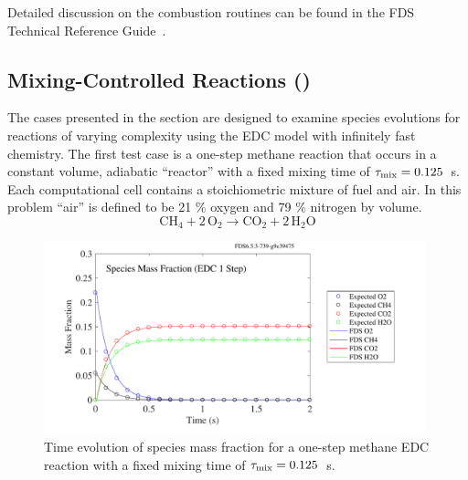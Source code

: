 \documentclass[11pt]{book}
\begin{document}
Detailed discussion on the combustion routines can be found in the FDS Technical Reference Guide~\cite{FDS_Tech_Guide}.

\subsection{Mixing-Controlled Reactions (\texorpdfstring{}{reactionrate\_EDC})}
\label{mixing_reactions}
\label{reactionrate_EDC_flim_1step_CH4}
\label{reactionrate_EDC_flim_1step_C3H8}
\label{reactionrate_EDC_1step_CH4_nonmix}
\label{reactionrate_EDC_O2lim_1step}
\label{reactionrate_EDC_O2lim_2fuel}
\label{reactionrate_series_reaction}
\label{reactionrate_EDC_flim_2step}
\label{reactionrate_lumped_two_air}

The cases presented in the section are designed to examine species evolutions for reactions of varying complexity using the EDC model with infinitely fast chemistry. The first test case is a one-step methane reaction that occurs in a constant volume, adiabatic ``reactor'' with a fixed mixing time of $\tau_{\rm mix}=0.125$~s. Each computational cell contains a stoichiometric mixture of fuel and air. In this problem ``air'' is defined to be 21 \% oxygen and 79 \% nitrogen by volume.
\begin{equation}\label{eq:1step_methane}
\mathrm{CH_4 + 2\, O_2 \rightarrow  CO_2 + 2\, H_2O}
\end{equation}

\begin{figure}[!ht]
\centering
\includegraphics[height=2.2in]{SCRIPT_FIGURES/reactionrate_EDC_flim_1step_CH4_spec}
\caption[Species evolution in a 1-step methane EDC reaction]{Time evolution of species mass fraction for a one-step methane EDC reaction with a fixed mixing time of $\tau_{\rm mix}=0.125$~s.}
\label{fig:EDC_1Step_meth_spec}
\end{figure}
\end{document}
